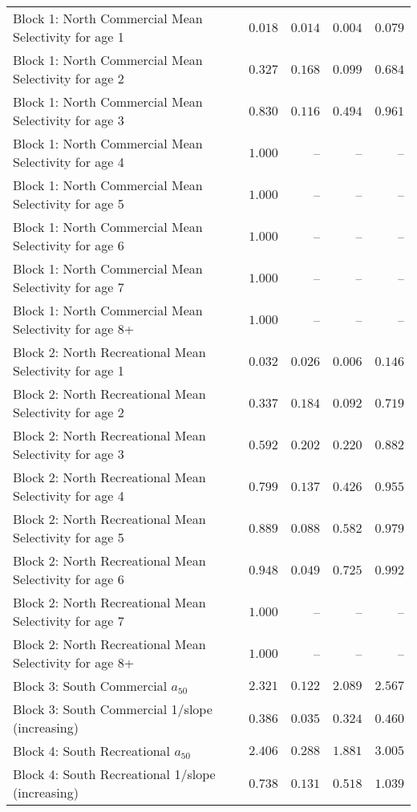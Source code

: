 \documentclass[
]{article}
\begin{document}
\begin{landscape}
\begin{longtable}[t]{lrrrr}
Block 1: North Commercial Mean Selectivity for age 1 & $0.018$ & $0.014$ & $0.004$ & $0.079$\\
Block 1: North Commercial Mean Selectivity for age 2 & $0.327$ & $0.168$ & $0.099$ & $0.684$\\
Block 1: North Commercial Mean Selectivity for age 3 & $0.830$ & $0.116$ & $0.494$ & $0.961$\\
Block 1: North Commercial Mean Selectivity for age 4 & $1.000$ & -- & -- & --\\
\addlinespace
Block 1: North Commercial Mean Selectivity for age 5 & $1.000$ & -- & -- & --\\
Block 1: North Commercial Mean Selectivity for age 6 & $1.000$ & -- & -- & --\\
Block 1: North Commercial Mean Selectivity for age 7 & $1.000$ & -- & -- & --\\
Block 1: North Commercial Mean Selectivity for age 8+ & $1.000$ & -- & -- & --\\
Block 2: North Recreational Mean Selectivity for age 1 & $0.032$ & $0.026$ & $0.006$ & $0.146$\\
\addlinespace
Block 2: North Recreational Mean Selectivity for age 2 & $0.337$ & $0.184$ & $0.092$ & $0.719$\\
Block 2: North Recreational Mean Selectivity for age 3 & $0.592$ & $0.202$ & $0.220$ & $0.882$\\
Block 2: North Recreational Mean Selectivity for age 4 & $0.799$ & $0.137$ & $0.426$ & $0.955$\\
Block 2: North Recreational Mean Selectivity for age 5 & $0.889$ & $0.088$ & $0.582$ & $0.979$\\
Block 2: North Recreational Mean Selectivity for age 6 & $0.948$ & $0.049$ & $0.725$ & $0.992$\\
\addlinespace
Block 2: North Recreational Mean Selectivity for age 7 & $1.000$ & -- & -- & --\\
Block 2: North Recreational Mean Selectivity for age 8+ & $1.000$ & -- & -- & --\\
Block 3: South Commercial $a_{50}$ & $2.321$ & $0.122$ & $2.089$ & $2.567$\\
Block 3: South Commercial 1/slope (increasing) & $0.386$ & $0.035$ & $0.324$ & $0.460$\\
Block 4: South Recreational $a_{50}$ & $2.406$ & $0.288$ & $1.881$ & $3.005$\\
\addlinespace
Block 4: South Recreational 1/slope (increasing) & $0.738$ & $0.131$ & $0.518$ & $1.039$\\

\end{longtable}
\end{landscape}
\end{document}
